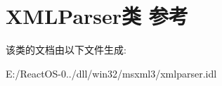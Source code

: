 \hypertarget{class_x_m_l_parser}{}\section{X\+M\+L\+Parser类 参考}
\label{class_x_m_l_parser}


该类的文档由以下文件生成\+:\begin{DoxyCompactItemize}
\item 
E\+:/\+React\+O\+S-\/0../dll/win32/msxml3/xmlparser.\+idl\end{DoxyCompactItemize}

